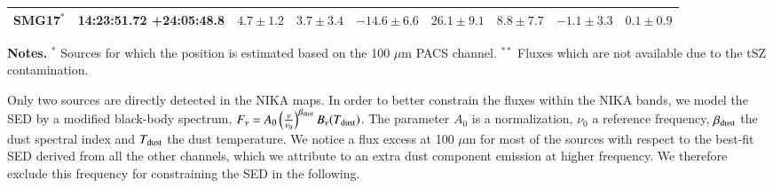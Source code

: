 \documentclass[twocolumn,traditabstract]{aa}
\begin{document}
\begin{table}[h]
\begin{center}
\begin{tabular}{ccccccccc}
SMG17$^*$ & 14:23:51.72 +24:05:48.8 & $     4.7 \pm      1.2$ & $     3.7 \pm      3.4$ & $   -14.6 \pm      6.6$ & $    26.1 \pm      9.1$ & $     8.8 \pm      7.7$ & $    -1.1 \pm      3.3$ & $     0.1 \pm      0.9$ \\
\hline
\end{tabular}
\end{center}
{\small {\bf Notes.} $^*$ Sources for which the position is estimated based on the 100 $\mu$m PACS channel. $^{**}$ Fluxes which are not available due to the tSZ contamination.}
\label{tab:IR_ps}
\end{table}

Only two sources are directly detected in the NIKA maps. In order to better constrain the fluxes within the NIKA bands, we model the SED by a modified black-body spectrum, $F_{\nu} = A_0 \left(\frac{\nu}{\nu_0}\right)^{\beta_{\rm dust}} B_{\nu}(T_{\rm dust})$. The parameter $A_0$ is a normalization, $\nu_0$ a reference frequency, $\beta_{\rm dust}$ the dust spectral index and $T_{\rm dust}$ the dust temperature. We notice a flux excess at 100 $\mu$m for most of the sources with respect to the best-fit SED derived from all the other channels, which we attribute to an extra dust component emission at higher frequency. We therefore exclude this frequency for constraining the SED in the following. 
\end{document}
